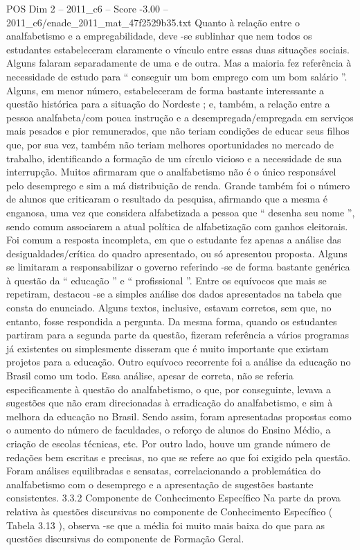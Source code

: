 \begin{textsample}{POS Dim 2 – 2011\_c6 – Score -3.00 – 2011\_c6/enade\_2011\_mat\_47f2529b35.txt}
Quanto à relação entre o analfabetismo e a empregabilidade, deve -se sublinhar que nem todos os estudantes estabeleceram claramente o vínculo entre essas duas situações sociais.
Alguns falaram separadamente de uma e de outra.
Mas a maioria fez referência à necessidade de estudo para “ conseguir um bom emprego com um bom salário ”.
Alguns, em menor número, estabeleceram de forma bastante interessante a questão histórica para a situação do Nordeste ; e, também, a relação entre a pessoa analfabeta/com pouca instrução e a desempregada/empregada em serviços mais pesados e pior remunerados, que não teriam condições de educar seus filhos que, por sua vez, também não teriam melhores oportunidades no mercado de trabalho, identificando a formação de um círculo vicioso e a necessidade de sua interrupção.
Muitos afirmaram que o analfabetismo não é o único responsável pelo desemprego e sim a má distribuição de renda.
Grande também foi o número de alunos que criticaram o resultado da pesquisa, afirmando que a mesma é enganosa, uma vez que considera alfabetizada a pessoa que “ desenha seu nome ”, sendo comum associarem a atual política de alfabetização com ganhos eleitorais.
Foi comum a resposta incompleta, em que o estudante fez apenas a análise das desigualdades/crítica do quadro apresentado, ou só apresentou proposta.
Alguns se limitaram a responsabilizar o governo referindo -se de forma bastante genérica à questão da “ educação ” e “ profissional ”.
Entre os equívocos que mais se repetiram, destacou -se a simples análise dos dados apresentados na tabela que consta do enunciado.
Alguns textos, inclusive, estavam corretos, sem que, no entanto, fosse respondida a pergunta.
Da mesma forma, quando os estudantes partiram para a segunda parte da questão, fizeram referência a vários programas já existentes ou simplesmente disseram que é muito importante que existam projetos para a educação.
Outro equívoco recorrente foi a análise da educação no Brasil como um todo.
Essa análise, apesar de correta, não se referia especificamente à questão do analfabetismo, o que, por conseguinte, levava a sugestões que não eram direcionadas à erradicação do analfabetismo, e sim à melhora da educação no Brasil.
Sendo assim, foram apresentadas propostas como o aumento do número de faculdades, o reforço de alunos do Ensino Médio, a criação de escolas técnicas, etc.
Por outro lado, houve um grande número de redações bem escritas e precisas, no que se refere ao que foi exigido pela questão.
Foram análises equilibradas e sensatas, correlacionando a problemática do analfabetismo com o desemprego e a apresentação de sugestões bastante consistentes. 3.3.2 Componente de Conhecimento Específico Na parte da prova relativa às questões discursivas no componente de Conhecimento Específico ( Tabela 3.13 ), observa -se que a média foi muito mais baixa do que para as questões discursivas do componente de Formação Geral.

\end{textsample}
